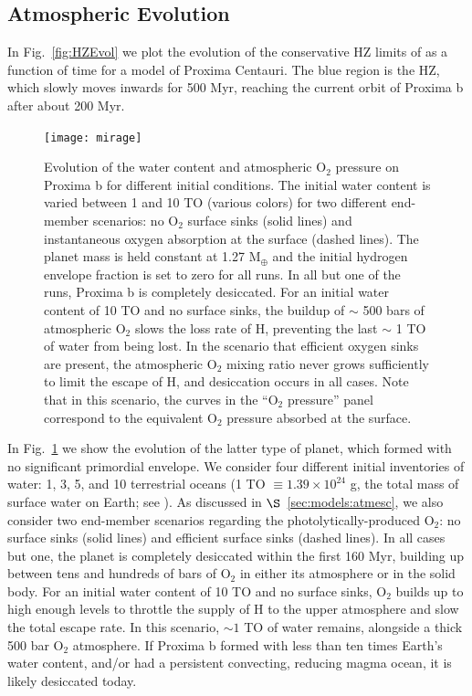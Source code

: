 \documentclass[preprint,12pt]{aastex}
\begin{document}
\subsection{Atmospheric Evolution}
\label{sec:results:atmesc}

In Fig.~\ref{fig:HZEvol} we plot the evolution of the conservative HZ limits of \cite{Kopparapu13} as a function of time for a model of Proxima Centauri. The blue region is the HZ, which slowly moves inwards for 500 Myr, reaching the current orbit of Proxima b after about 200 Myr.

\begin{figure}[ht]
\centering
\texttt{[image: mirage]}
\caption{Evolution of the water content and atmospheric O$_2$ pressure
  on Proxima b for different initial conditions. The initial water
  content is varied between 1 and 10 TO (various colors) for two
  different end-member scenarios: no O$_2$ surface sinks (solid lines)
  and instantaneous oxygen absorption at the surface (dashed
  lines). The planet mass is held constant at 1.27 M$_\oplus$ and the
  initial hydrogen envelope fraction is set to zero for all runs. In
  all but one of the runs, Proxima b is completely desiccated. For an
  initial water content of 10 TO and no surface sinks, the buildup of
  $\sim$ 500 bars of atmospheric O$_2$ slows the loss rate of H,
  preventing the last $\sim$ 1 TO of water from being lost. In the
  scenario that efficient oxygen sinks are present, the atmospheric
  O$_2$ mixing ratio never grows sufficiently to limit the escape of
  H, and desiccation occurs in all cases. Note that in this scenario,
  the curves in the ``O$_2$ pressure'' panel correspond to the
  equivalent O$_2$ pressure absorbed at the surface.}
\label{fig:atmesc:mirage}
\end{figure}

In Fig.~\ref{fig:atmesc:mirage} we show the evolution of the latter
type of planet, which formed with no significant primordial
envelope. We consider four different initial inventories of water: 1,
3, 5, and 10 terrestrial oceans (1 TO $\equiv 1.39\times 10^{24}$ g,
the total mass of surface water on Earth; see \cite{Kasting88}). As
discussed in $\S$~\ref{sec:models:atmesc}, we also consider two end-member
scenarios regarding the photolytically-produced O$_2$: no surface
sinks (solid lines) and efficient surface sinks (dashed lines). In all
cases but one, the planet is completely desiccated within the first
160 Myr, building up between tens and hundreds of bars of O$_2$ in
either its atmosphere or in the solid body. For an initial water
content of 10 TO and no surface sinks, O$_2$ builds up to high enough
levels to throttle the supply of H to the upper atmosphere and slow
the total escape rate. In this scenario, $\sim 1$ TO of water remains,
alongside a thick 500 bar O$_2$ atmosphere. If Proxima b formed with
less than ten times Earth's water content, and/or had a persistent
convecting, reducing magma ocean, it is likely desiccated today.
\end{document}
